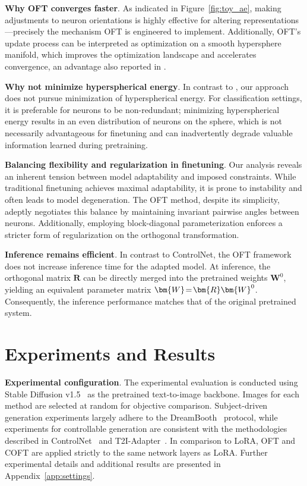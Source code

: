 {\textbf{Why OFT converges faster}. As indicated in Figure~\ref{fig:toy_ae}, making adjustments to neuron orientations is highly effective for altering representations—precisely the mechanism OFT is engineered to implement. Additionally, OFT’s update process can be interpreted as optimization on a smooth hypersphere manifold, which improves the optimization landscape and accelerates convergence, an advantage also reported in \cite{liu2021orthogonal}.

\textbf{Why not minimize hyperspherical energy}. In contrast to \cite{liu2021orthogonal}, our approach does not pursue minimization of hyperspherical energy. For classification settings, it is preferable for neurons to be non-redundant; minimizing hyperspherical energy results in an even distribution of neurons on the sphere, which is not necessarily advantageous for finetuning and can inadvertently degrade valuable information learned during pretraining.

\textbf{Balancing flexibility and regularization in finetuning}. Our analysis reveals an inherent tension between model adaptability and imposed constraints. While traditional finetuning achieves maximal adaptability, it is prone to instability and often leads to model degeneration. The OFT method, despite its simplicity, adeptly negotiates this balance by maintaining invariant pairwise angles between neurons. Additionally, employing block-diagonal parameterization enforces a stricter form of regularization on the orthogonal transformation.

\textbf{Inference remains efficient}. In contrast to ControlNet, the OFT framework does not increase inference time for the adapted model. At inference, the orthogonal matrix $\bm{R}$ can be directly merged into the pretrained weights $\bm{W}^0$, yielding an equivalent parameter matrix $\thickmuskip=2mu \medmuskip=2mu \bm{W}=\bm{R}\bm{W}^0$. Consequently, the inference performance matches that of the original pretrained system.

\section{Experiments and Results}

\textbf{Experimental configuration}. The experimental evaluation is conducted using Stable Diffusion v1.5~\cite{rombach2022high} as the pretrained text-to-image backbone. Images for each method are selected at random for objective comparison. Subject-driven generation experiments largely adhere to the DreamBooth~\cite{ruiz2023dreambooth} protocol, while experiments for controllable generation are consistent with the methodologies described in ControlNet~\cite{zhang2023adding} and T2I-Adapter~\cite{mou2023t2i}. In comparison to LoRA, OFT and COFT are applied strictly to the same network layers as LoRA. Further experimental details and additional results are presented in Appendix~\ref{app:settings}.

}
